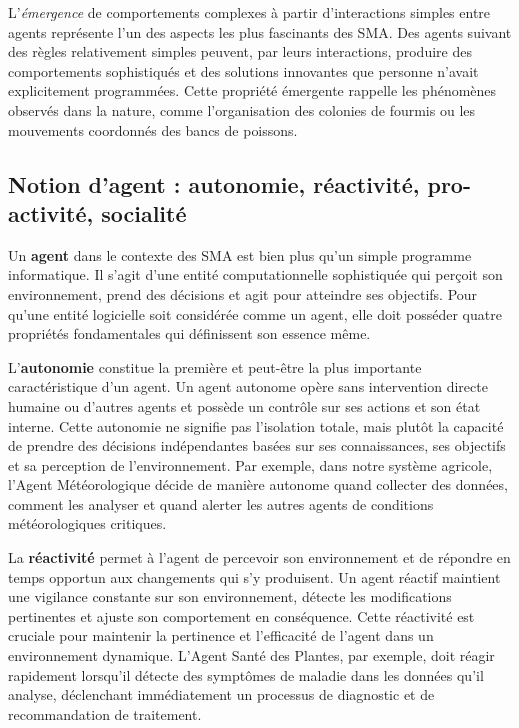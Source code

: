L'\emph{émergence} de comportements complexes à partir d'interactions simples entre agents représente l'un des aspects les plus fascinants des SMA. Des agents suivant des règles relativement simples peuvent, par leurs interactions, produire des comportements sophistiqués et des solutions innovantes que personne n'avait explicitement programmées. Cette propriété émergente rappelle les phénomènes observés dans la nature, comme l'organisation des colonies de fourmis ou les mouvements coordonnés des bancs de poissons.

\subsection{Notion d'agent : autonomie, réactivité, pro-activité, socialité}

Un \textbf{agent} dans le contexte des SMA est bien plus qu'un simple programme informatique. Il s'agit d'une entité computationnelle sophistiquée qui perçoit son environnement, prend des décisions et agit pour atteindre ses objectifs. Pour qu'une entité logicielle soit considérée comme un agent, elle doit posséder quatre propriétés fondamentales qui définissent son essence même.

L'\textbf{autonomie} constitue la première et peut-être la plus importante caractéristique d'un agent. Un agent autonome opère sans intervention directe humaine ou d'autres agents et possède un contrôle sur ses actions et son état interne. Cette autonomie ne signifie pas l'isolation totale, mais plutôt la capacité de prendre des décisions indépendantes basées sur ses connaissances, ses objectifs et sa perception de l'environnement. Par exemple, dans notre système agricole, l'Agent Météorologique décide de manière autonome quand collecter des données, comment les analyser et quand alerter les autres agents de conditions météorologiques critiques.

La \textbf{réactivité} permet à l'agent de percevoir son environnement et de répondre en temps opportun aux changements qui s'y produisent. Un agent réactif maintient une vigilance constante sur son environnement, détecte les modifications pertinentes et ajuste son comportement en conséquence. Cette réactivité est cruciale pour maintenir la pertinence et l'efficacité de l'agent dans un environnement dynamique. L'Agent Santé des Plantes, par exemple, doit réagir rapidement lorsqu'il détecte des symptômes de maladie dans les données qu'il analyse, déclenchant immédiatement un processus de diagnostic et de recommandation de traitement.

